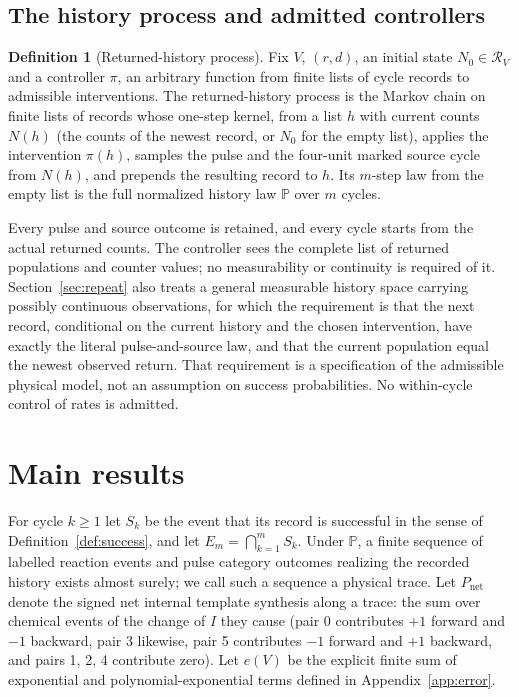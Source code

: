 \documentclass[11pt,a4paper]{article}
\theoremstyle{plain}
\theoremstyle{definition}
\newtheorem{definition}[theorem]{Definition}
\theoremstyle{remark}
\newcommand{\Prob}{\mathbb P}
\newcommand{\cR}{\mathcal R}
\newcommand{\Iv}{I}
\newcommand{\Pnet}{P_{\mathrm{net}}}
\begin{document}
\subsection{The history process and admitted controllers}\label{sec:history}
\begin{definition}[Returned-history process]\label{def:process}
Fix $V$, $(r,d)$, an initial state $N_0\in\cR_V$ and a controller $\pi$, an arbitrary function from finite lists of cycle records to admissible interventions. The returned-history process is the Markov chain on finite lists of records whose one-step kernel, from a list $h$ with current counts $N(h)$ (the counts of the newest record, or $N_0$ for the empty list), applies the intervention $\pi(h)$, samples the pulse and the four-unit marked source cycle from $N(h)$, and prepends the resulting record to $h$. Its $m$-step law from the empty list is the full normalized history law $\Prob$ over $m$ cycles.
\end{definition}
Every pulse and source outcome is retained, and every cycle starts from the actual returned counts. The controller sees the complete list of returned populations and counter values; no measurability or continuity is required of it. Section~\ref{sec:repeat} also treats a general measurable history space carrying possibly continuous observations, for which the requirement is that the next record, conditional on the current history and the chosen intervention, have exactly the literal pulse-and-source law, and that the current population equal the newest observed return. That requirement is a specification of the admissible physical model, not an assumption on success probabilities. No within-cycle control of rates is admitted.

\section{Main results}\label{sec:main}

For cycle $k\ge1$ let $S_k$ be the event that its record is successful in the sense of Definition~\ref{def:success}, and let $E_m=\bigcap_{k=1}^mS_k$. Under $\Prob$, a finite sequence of labelled reaction events and pulse category outcomes realizing the recorded history exists almost surely; we call such a sequence a physical trace. Let $\Pnet$ denote the signed net internal template synthesis along a trace: the sum over chemical events of the change of $\Iv$ they cause (pair 0 contributes $+1$ forward and $-1$ backward, pair 3 likewise, pair 5 contributes $-1$ forward and $+1$ backward, and pairs 1, 2, 4 contribute zero). Let $e(V)$ be the explicit finite sum of exponential and polynomial-exponential terms defined in Appendix~\ref{app:error}.
\end{document}
